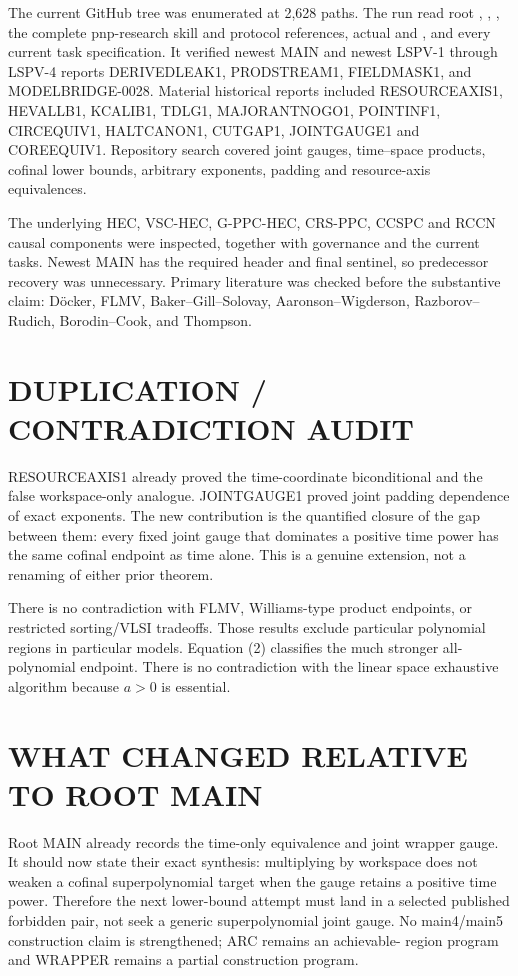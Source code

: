 \documentclass[11pt]{article}
\begin{document}
The current GitHub tree was enumerated at 2,628 paths.  The run read root
, , , the complete
pnp-research skill and protocol references, actual  and
, and every current task specification.  It verified newest
MAIN  and newest
LSPV-1 through LSPV-4 reports DERIVEDLEAK1, PRODSTREAM1, FIELDMASK1, and
MODELBRIDGE-0028.  Material historical reports included RESOURCEAXIS1,
HEVALLB1, KCALIB1, TDLG1, MAJORANTNOGO1, POINTINF1, CIRCEQUIV1, HALTCANON1,
CUTGAP1, JOINTGAUGE1 and COREEQUIV1.  Repository search covered joint gauges,
time--space products, cofinal lower bounds, arbitrary exponents, padding and
resource-axis equivalences.

The underlying HEC, VSC-HEC, G-PPC-HEC, CRS-PPC, CCSPC and RCCN causal
components were inspected, together with governance and the current tasks.
Newest MAIN has the required header and final sentinel, so predecessor recovery
was unnecessary.  Primary literature was checked before the substantive
claim: D\"ocker, FLMV, Baker--Gill--Solovay, Aaronson--Wigderson,
Razborov--Rudich, Borodin--Cook, and Thompson.

\section{DUPLICATION / CONTRADICTION AUDIT}

RESOURCEAXIS1 already proved the time-coordinate biconditional and the false
workspace-only analogue.  JOINTGAUGE1 proved joint padding dependence of
exact exponents.  The new contribution is the quantified closure of the gap
between them: every fixed joint gauge that dominates a positive time power has
the same cofinal endpoint as time alone.  This is a genuine extension, not a
renaming of either prior theorem.

There is no contradiction with FLMV, Williams-type product endpoints, or
restricted sorting/VLSI tradeoffs.  Those results exclude particular
polynomial regions in particular models.  Equation (2) classifies the much
stronger all-polynomial endpoint.  There is no contradiction with the linear
space exhaustive algorithm because $a>0$ is essential.

\section{WHAT CHANGED RELATIVE TO ROOT MAIN}

Root MAIN already records the time-only equivalence and joint wrapper gauge.
It should now state their exact synthesis: multiplying by workspace does not
weaken a cofinal superpolynomial target when the gauge retains a positive time
power.  Therefore the next lower-bound attempt must land in a selected
published forbidden pair, not seek a generic superpolynomial joint gauge.
No main4/main5 construction claim is strengthened; ARC remains an achievable-
region program and WRAPPER remains a partial construction program.
\end{document}
